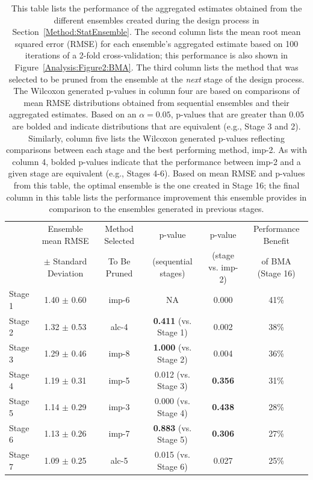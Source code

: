 \documentclass[12pt]{article}
\newcommand{\+}[1]{\ensuremath{\mathbf{#1}}}
\begin{document}
\begin{table}[t!]
	\centering
	\caption[Table 2]{This table lists the performance of the aggregated estimates obtained from the different ensembles created during the design process in Section~\ref{Method:StatEnsemble}. The second column lists the mean root mean squared error (RMSE) for each ensemble's aggregated estimate based on 100 iterations of a 2-fold cross-validation; this performance is also shown in Figure~\ref{Analysis:Figure2:BMA}.  The third column lists the method that was selected to be pruned from the ensemble at the \emph{next} stage of the design process. The Wilcoxon generated p-values in column four are based on comparisons of mean RMSE distributions obtained from sequential ensembles and their aggregated estimates. Based on an $\alpha = 0.05$, p-values that are greater than $0.05$ are bolded and indicate distributions that are equivalent (e.g., Stage 3 and 2). Similarly, column five lists the Wilcoxon generated p-values reflecting comparisons between each stage and the best performing method, imp-2. As with column 4, bolded p-values indicate that the performance between imp-2 and a given stage are equivalent (e.g., Stages 4-6). Based on mean RMSE and p-values from this table, the optimal ensemble is the one created in Stage 16; the final column in this table lists the performance improvement this ensemble provides in comparison to the ensembles generated in previous stages.}
	\scriptsize
	\begin{tabular}{l|c|c|c|c|c}
		\hline
		\hline
		 & Ensemble mean RMSE & Method Selected & p-value & p-value  & Performance  Benefit\\
		 & $\pm$ Standard Deviation & To Be Pruned & (sequential stages) & (stage vs. imp-2)  &  of BMA (Stage 16)\\
		\hline
		Stage 1 & 1.40 $\pm$ 0.60 & imp-6 & NA & 0.000 & 41\%\\
		Stage 2  & 1.32 $\pm$ 0.53 & alc-4&  \textbf{0.411} (vs. Stage 1) & 0.002 & 38\%\\
		Stage 3 & 1.29 $\pm$ 0.46 & imp-8 & \textbf{1.000}  (vs. Stage 2) & 0.004 & 36\%\\
		Stage 4 & 1.19 $\pm$ 0.31 & imp-5 & 0.012  (vs. Stage 3) & \textbf{0.356} & 31\%\\
		Stage 5 & 1.14 $\pm$ 0.29 & imp-3 & 0.000  (vs. Stage 4) & \textbf{0.438} & 28\%\\
		Stage 6 & 1.13 $\pm$ 0.26 & imp-7 & \textbf{0.883}  (vs. Stage 5)& \textbf{0.306} & 27\%\\
		Stage 7 & 1.09 $\pm$ 0.25 & alc-5 & 0.015  (vs. Stage 6) &  0.027 & 25\%\\

\end{tabular}
\end{table}
\end{document}
